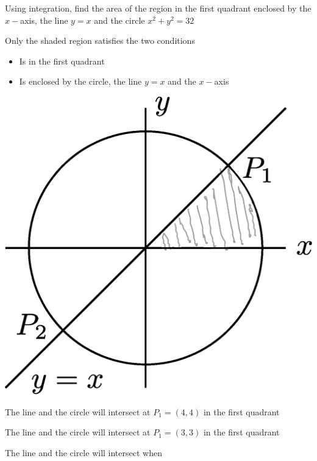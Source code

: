 \documentclass[14pt,fleqn]{extarticle}
\begin{document}
\newcommand\ysq{32-x^2}
\newcommand\ycirc{\sqrt{\ysq}} 
\newcommand\intga{\int_0^4}
\newcommand\intgb{\int_4^{\sqrt{32}}}

Using integration, find the area of the region in the first quadrant 
enclosed by the $x-$axis, the line $y=x$ and the circle $x^2+y^2 = 32$

\newcard

Only the shaded region satisfies the two conditions

\begin{itemize}
\item{Is in the first quadrant} 
\item{Is enclosed by the circle, the line $y=x$ and the $x-$axis} 
\end{itemize} 

\begin{center}
\includegraphics[scale=0.3]{figure.eps}
\end{center}

\newcard

The line and the circle will intersect at $P_1 = (4,4)$ in the first quadrant 
        
\newcard 

The line and the circle will intersect at $P_1 = (3,3)$ in the first quadrant 

\newcard 

The line and the circle will intersect when 
\end{document}
